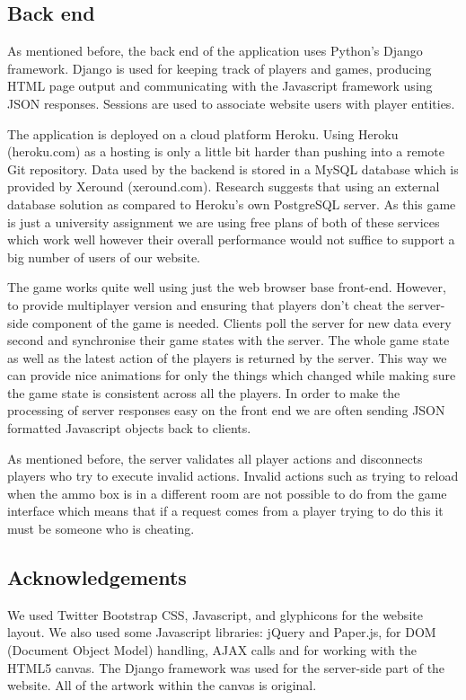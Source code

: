 \documentclass{article}
\begin{document}
\subsection{Back end}
As mentioned before, the back end of the application uses Python's Django framework. Django is used for keeping track of players and games, producing HTML page output and communicating with the Javascript framework using JSON responses. Sessions are used to associate website users with player entities.

The application is deployed on a cloud platform Heroku. Using Heroku (heroku.com) as a hosting is only a little bit harder than pushing into a remote Git repository. Data used by the backend is stored in a MySQL database which is provided by Xeround (xeround.com). Research suggests that using an external database solution as compared to Heroku's own PostgreSQL server. As this game is just a university assignment we are using free plans of both of these services which work well however their overall performance would not suffice to support a big number of users of our website.

The game works quite well using just the web browser base front-end. However, to provide multiplayer version and ensuring that players don't cheat the server-side component of the game is needed. Clients poll the server for new data every second and synchronise their game states with the server. The whole game state as well as the latest action of the players is returned by the server. This way we can provide nice animations for only the things which changed while making sure the game state is consistent across all the players. In order to make the processing of server responses easy on the front end we are often sending JSON formatted Javascript objects back to clients.

As mentioned before, the server validates all player actions and disconnects players who try to execute invalid actions. Invalid actions such as trying to reload when the ammo box is in a different room are not possible to do from the game interface which means that if a request comes from a player trying to do this it must be someone who is cheating.

\subsection{Acknowledgements}
We used Twitter Bootstrap CSS, Javascript, and glyphicons for the website layout. We also used some Javascript libraries: jQuery and Paper.js, for DOM (Document Object Model) handling, AJAX calls and for working with the HTML5 canvas. The Django framework was used for the server-side part of the website. All of the artwork within the canvas is original.
\end{document}
